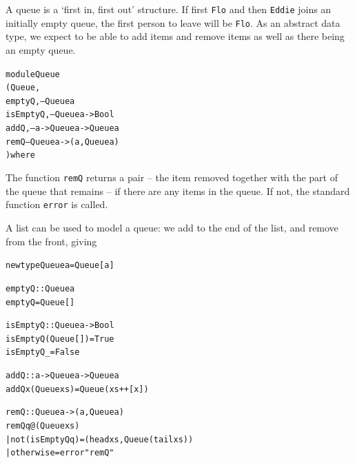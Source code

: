 A queue is a `first in, first out' structure. If first \texttt{Flo} and
then \texttt{Eddie} joins an initially
empty queue, the first person to leave will be 
\texttt{Flo}. As an abstract data type, we expect to be able to add items and remove
items as well as there being an empty queue.
\begin{alltt}
module Queue 
  ( Queue , 
    emptyQ ,       --  Queue a
    isEmptyQ ,     --  Queue a -> Bool 
    addQ ,         --  a -> Queue a -> Queue a
    remQ           --  Queue a -> (  a , Queue a )
   ) where 
\end{alltt}
The function \texttt{remQ} returns a pair -- the item removed together with the
part of the queue that remains -- if there are any items in the queue. If not,
the standard function \texttt{error} is called.

A list can be used to model a queue: we add to the end of the list, and
remove from the front, giving
\begin{alltt}
newtype Queue a = Queue [a]
 
emptyQ :: Queue a
emptyQ = Queue []

isEmptyQ :: Queue a -> Bool
isEmptyQ (Queue []) = True
isEmptyQ _          = False

addQ   :: a -> Queue a -> Queue a
addQ x (Queue xs) = Queue (xs++[x])

remQ   :: Queue a -> (  a , Queue a )
remQ q@(Queue xs)
  | not (isEmptyQ q)   = (head xs , Queue (tail xs))
  | otherwise          = error "remQ"
\end{alltt}



